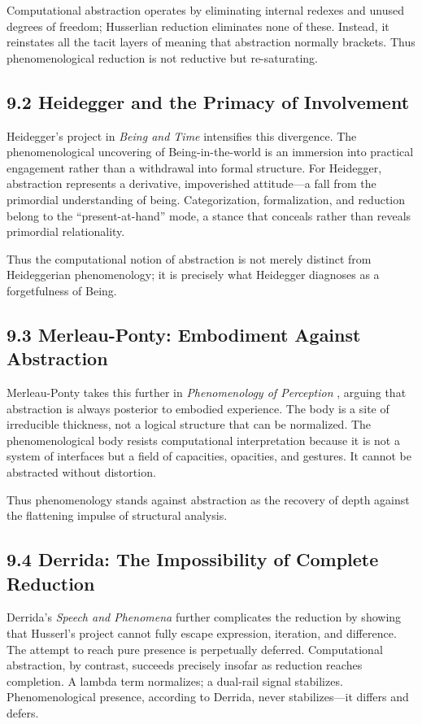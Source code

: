 \documentclass[11pt,letterpaper]{article}
\begin{document}
Computational abstraction operates by eliminating internal redexes and unused degrees of freedom; Husserlian reduction eliminates none of these. Instead, it reinstates all the tacit layers of meaning that abstraction normally brackets. Thus phenomenological reduction is not reductive but re-saturating.

\subsection{9.2 Heidegger and the Primacy of Involvement}
Heidegger’s project in \textit{Being and Time} \parencite{Heidegger1927} intensifies this divergence. The phenomenological uncovering of Being-in-the-world is an immersion into practical engagement rather than a withdrawal into formal structure. For Heidegger, abstraction represents a derivative, impoverished attitude—a fall from the primordial understanding of being. Categorization, formalization, and reduction belong to the “present-at-hand” mode, a stance that conceals rather than reveals primordial relationality.

Thus the computational notion of abstraction is not merely distinct from Heideggerian phenomenology; it is precisely what Heidegger diagnoses as a forgetfulness of Being.

\subsection{9.3 Merleau-Ponty: Embodiment Against Abstraction}
Merleau-Ponty takes this further in \textit{Phenomenology of Perception} \parencite{MerleauPonty1945}, arguing that abstraction is always posterior to embodied experience. The body is a site of irreducible thickness, not a logical structure that can be normalized. The phenomenological body resists computational interpretation because it is not a system of interfaces but a field of capacities, opacities, and gestures. It cannot be abstracted without distortion.

Thus phenomenology stands against abstraction as the recovery of depth against the flattening impulse of structural analysis.

\subsection{9.4 Derrida: The Impossibility of Complete Reduction}
Derrida’s \textit{Speech and Phenomena} \parencite{Derrida1967} further complicates the reduction by showing that Husserl’s project cannot fully escape expression, iteration, and difference. The attempt to reach pure presence is perpetually deferred. Computational abstraction, by contrast, succeeds precisely insofar as reduction reaches completion. A lambda term normalizes; a dual-rail signal stabilizes. Phenomenological presence, according to Derrida, never stabilizes—it differs and defers.
\end{document}
